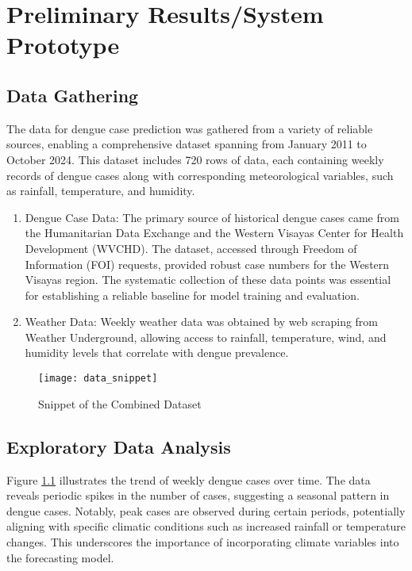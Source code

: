 \chapter{Preliminary Results/System Prototype}
\section{Data Gathering}
The data for dengue case prediction was gathered from a variety of reliable sources, enabling a comprehensive dataset spanning from January 2011 to October 2024. This dataset includes 720 rows of data, each containing weekly records of dengue cases along with corresponding meteorological variables, such as rainfall, temperature, and humidity.
\begin{enumerate}
	\item Dengue Case Data: The primary source of historical dengue cases came from the Humanitarian Data Exchange and the Western Visayas Center for Health Development (WVCHD). The dataset, accessed through Freedom of Information (FOI) requests, provided robust case numbers for the Western Visayas region. The systematic collection of these data points was essential for establishing a reliable baseline for model training and evaluation.
	\item Weather Data: Weekly weather data was obtained by web scraping from Weather Underground, allowing access to rainfall, temperature, wind, and humidity levels that correlate with dengue prevalence.
\end{enumerate}

\begin{figure}[ht]
	\centering
	\texttt{[image: data\_snippet]}
	\caption{Snippet of the Combined Dataset}
	\label{fig:data_snippet}
\end{figure}

\section{Exploratory Data Analysis}

Figure \ref{fig:data_snippet} illustrates the trend of weekly dengue cases over time. The data reveals periodic spikes in the number of cases, suggesting a seasonal pattern in dengue cases. Notably, peak cases are observed during certain periods, potentially aligning with specific climatic conditions such as increased rainfall or temperature changes. This underscores the importance of incorporating climate variables into the forecasting model.


